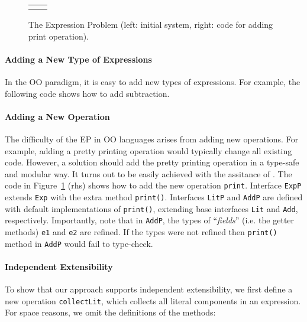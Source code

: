 \begin{figure}
\begin{tabular}{l|l}
&
\end{tabular}
\caption{The Expression Problem (left: initial system, right: code for adding
  print operation).}\label{fig:ep}
\end{figure}%

\paragraph{Adding a New Type of Expressions}
In the OO paradigm, it is easy to add new types of expressions. For example, the
following code shows how to add subtraction.


\paragraph{Adding a New Operation} The difficulty of the EP in OO  
languages arises from adding new operations. For example, adding a pretty printing 
operation would typically change all existing code. However, a solution 
should add the pretty printing operation in a type-safe and modular way.  It
turns out to be easily achieved with the assitance of \mixin.  The code in
Figure~\ref{fig:ep} (rhs) shows how to add the new operation \texttt{print}.
Interface \texttt{ExpP} extends \texttt{Exp} with the extra method
\texttt{print()}. Interfaces \texttt{LitP} and \texttt{AddP} are defined with
default implementations of \texttt{print()}, extending base interfaces
\texttt{Lit} and \texttt{Add}, respectively. Importantly, note that in
\texttt{AddP}, the types of ``\emph{fields}'' (i.e. the getter methods)
\texttt{e1} and \texttt{e2} are refined. If the types were not refined then
\texttt{print()} method in \texttt{AddP} would fail to type-check.

\paragraph{Independent Extensibility}
To show that our approach supports independent extensibility, we first define a
new operation \texttt{collectLit}, which collects all
literal components in an expression. For space reasons, 
we omit the definitions of the methods: 

